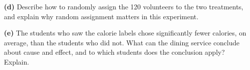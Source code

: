 \documentclass[12pt]{article}
\begin{document}
\begin{enumerate}[leftmargin=1.9em, itemsep=0.16in, resume]
        \vspace{6pt}
        \boxguard[16]
        \textbf{(d)} Describe how to randomly assign the 120 volunteers to the two treatments,
        and explain why random assignment matters in this experiment.\\[4pt]

        \vspace{6pt}
        \boxguard[17]
        \textbf{(e)} The students who saw the calorie labels chose significantly fewer calories,
        on average, than the students who did not. What can the dining service conclude about
        cause and effect, and to which students does the conclusion apply? Explain.\\[4pt]

\end{enumerate}
\end{document}
